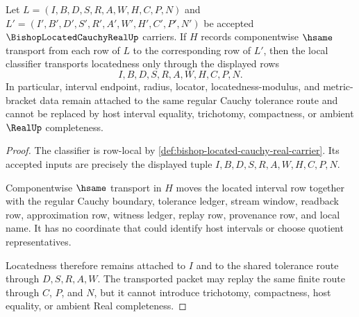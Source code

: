 \begin{theorem}
\label{thm:bishop-located-cauchy-real-located-interval-stability}
Let $L=(I,B,D,S,R,A,W,H,C,P,N)$ and $L'=(I',B',D',S',R',A',W',H',C',P',N')$ be accepted $\BishopLocatedCauchyRealUp$ carriers. If $H$ records componentwise $\hsame$ transport from each row of $L$ to the corresponding row of $L'$, then the local classifier transports locatedness only through the displayed rows
$$
I,B,D,S,R,A,W,H,C,P,N .
$$
In particular, interval endpoint, radius, locator, locatedness-modulus, and metric-bracket data remain attached to the same regular Cauchy tolerance route and cannot be replaced by host interval equality, trichotomy, compactness, or ambient $\RealUp$ completeness.
\end{theorem}
\begin{proof}
The classifier is row-local by \autoref{def:bishop-located-cauchy-real-carrier}. Its accepted inputs are precisely the displayed tuple $I,B,D,S,R,A,W,H,C,P,N$.

Componentwise $\hsame$ transport in $H$ moves the located interval row together with the regular Cauchy boundary, tolerance ledger, stream window, readback row, approximation row, witness ledger, replay row, provenance row, and local name. It has no coordinate that could identify host intervals or choose quotient representatives.

Locatedness therefore remains attached to $I$ and to the shared tolerance route through $D,S,R,A,W$. The transported packet may replay the same finite route through $C$, $P$, and $N$, but it cannot introduce trichotomy, compactness, host equality, or ambient Real completeness.
\end{proof}

